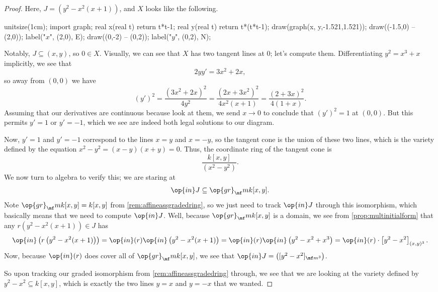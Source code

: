\begin{proof}
	Here, $J=\left(y^2-x^2(x+1)\right)$, and $X$ looks like the following.
	\begin{center}
		\begin{asy}
			unitsize(1cm);
			import graph;
			real x(real t)
			{
				return t*t-1;
			}
			real y(real t)
			{
				return t*(t*t-1);
			}
			draw(graph(x, y,-1.521,1.521));
			draw((-1.5,0) -- (2,0)); label("$x$", (2,0), E);
			draw((0,-2) -- (0,2)); label("$y$", (0,2), N);
		\end{asy}
	\end{center}
	Notably, $J\subseteq(x,y)$, so $0\in X$. Visually, we can see that $X$ has two tangent lines at $0$; let's compute them. Differentiating $y^2=x^3+x$ implicitly, we see that
	\[2yy'=3x^2+2x,\]
	so away from $(0,0)$ we have
	\[(y')^2=\frac{\left(3x^2+2x\right)^2}{4y^2}=\frac{\left(2x+3x^2\right)^2}{4x^2(x+1)}=\frac{(2+3x)^2}{4(1+x)}.\]
	Assuming that our derivatives are continuous because look at them, we send $x\to0$ to conclude that $(y')^2=1$ at $(0,0)$. But this permits $y'=1$ or $y'=-1$, which we see are indeed both legal solutions to our diagram.

	Now, $y'=1$ and $y'=-1$ correspond to the lines $x=y$ and $x=-y$, so the tangent cone is the union of these two lines, which is the variety defined by the equation $x^2-y^2=(x-y)(x+y)=0$. Thus, the coordinate ring of the tangent cone is
	\[\frac{k[x,y]}{\left(x^2-y^2\right)}.\]
	We now turn to algebra to verify this; we are staring at
	\[\op{in}J\subseteq\op{gr}_\mf mk[x,y].\]
	Note $\op{gr}_\mf mk[x,y]=k[x,y]$ from \autoref{rem:affineassgradedring}, so we just need to track $\op{in}J$ through this isomorphism, which basically means that we need to compute $\op{in}J$. Well, because $\op{gr}_\mf mk[x,y]$ is a domain, we see from \autoref{prop:multinitialform} that any $r\left(y^2-x^2(x+1)\right)\in J$ has
	\[\op{in}\left(r\left(y^2-x^2(x+1)\right)\right)=\op{in}(r)\op{in}\left(y^2-x^2(x+1)\right)=\op{in}(r)\op{in}\left(y^2-x^2+x^3\right)=\op{in}(r)\cdot\left[y^2-x^2\right]_{(x,y)^3}.\]
	Now, because $\op{in}(r)$ does cover all of $\op{gr}_\mf mk[x,y]$, we see that $\op{in}J=\left([y^2-x^2]_{\mf m^3}\right)$.
	
	So upon tracking our graded isomorphism from \autoref{rem:affineassgradedring} through, we see that we are looking at the variety defined by $y^2-x^2\subseteq k[x,y]$, which is exactly the two lines $y=x$ and $y=-x$ that we wanted.
\end{proof}

